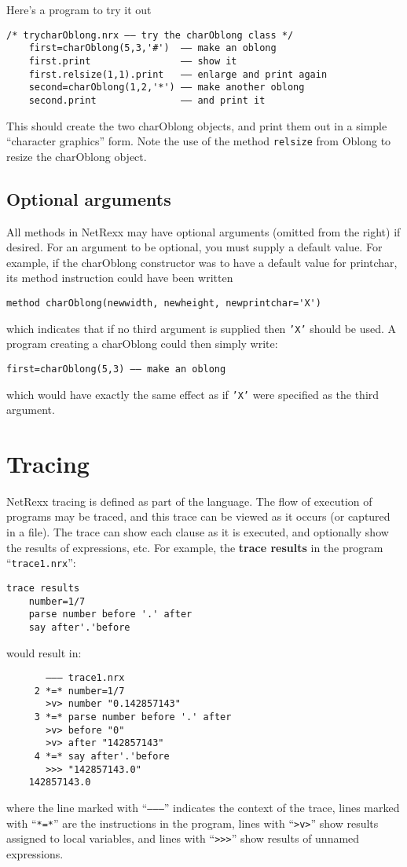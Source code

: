 Here’s a program to try it out
\begin{lstlisting}[label=trycharoblong,caption=tryCharOblong.nrx]
    /* trycharOblong.nrx –– try the charOblong class */
    first=charOblong(5,3,'#')  –– make an oblong
    first.print                –– show it
    first.relsize(1,1).print   –– enlarge and print again
    second=charOblong(1,2,'*') –– make another oblong
    second.print               –– and print it
\end{lstlisting}
This should create the two charOblong objects, and print them out in a simple “character graphics” form. Note the use of the method \texttt{relsize} from Oblong to resize the charOblong object.
\subsection{Optional arguments}
All methods in NetRexx may have optional arguments (omitted from the
right) if desired. For an argument to be optional, you must supply a
default value. For example, if the charOblong constructor was to have
a default value for printchar, its method instruction could have been
written
\begin{lstlisting}[label=default,caption=Default value X]
method charOblong(newwidth, newheight, newprintchar='X')
\end{lstlisting}
which indicates that if no third argument is supplied then \texttt{'X'} should be used. A program
creating a charOblong could then simply write:
\begin{lstlisting}[label=default,caption=Default value]
first=charOblong(5,3) –– make an oblong
\end{lstlisting}
which would have exactly the same effect as if \texttt{'X'} were specified as
the third argument.


\section{Tracing}
NetRexx tracing is defined as part of the language. The flow of
execution of programs may be traced, and this trace can be viewed as
it occurs (or captured in a file). The trace can show each clause as
it is executed, and optionally show the results of expressions,
etc. For example, the \textbf{trace results} in the program “\texttt{trace1.nrx}”:
\begin{lstlisting}[label=trace,caption=Trace]
    trace results
    number=1/7
    parse number before '.' after
    say after'.'before
\end{lstlisting}
would result in:
\begin{verbatim}
       ––– trace1.nrx
     2 *=* number=1/7
       >v> number "0.142857143"
     3 *=* parse number before '.' after
       >v> before "0"
       >v> after "142857143"
     4 *=* say after'.'before
       >>> "142857143.0"
    142857143.0
\end{verbatim}
where the line marked with “\texttt{–––}” indicates the context of the trace, lines marked with “\texttt{*=*}” are the instructions in the program, lines with “\texttt{>v>}” show results assigned to local variables, and lines with “\texttt{>>>}” show results of unnamed expressions.

